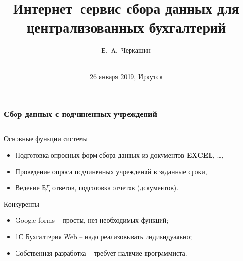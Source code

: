 \documentclass[10pt]{beamer}
\begin{document}
\title{Интернет--сервис сбора данных для централизованных бухгалтерий}
\author{Е.~А.~Черкашин}
\date[2019]{{}\\[1.5cm]
26 января 2019, Иркутск
}
\maketitle

\begin{frame}
  \frametitle{Сбор данных с подчиненных учреждений}
  \begin{columns}
    \begin{column}{0.6\linewidth}
  \begin{block}{Основные функции системы}
  \begin{itemize}
  \item Подготовка опросных форм сбора данных из документов \textbf{EXCEL}, \ldots,
  \item Проведение опроса подчиненных учреждений в заданные сроки,
  \item Ведение БД ответов, подготовка отчетов (документов).
  \end{itemize}
\end{block}
  \begin{block}{Конкуренты}
  \begin{itemize}
  \item Google forms -- просты, нет необходимых функций;
  \item 1С Бухгалтерия Web -- надо реализовывать индивидуально;
  \item Собственная разработка -- требует наличие программиста.
  \end{itemize}
\end{block}
  \end{column}
  \begin{column}{0.4\linewidth}

\end{column}
\end{columns}
\end{frame}
\end{document}
